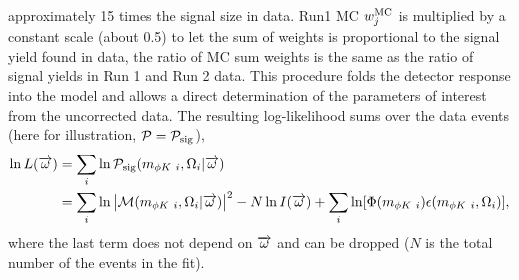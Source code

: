 approximately 15 times the signal size in data. Run1 MC $w_j^{\rm MC}$ is multiplied by a constant 
scale (about 0.5) to let the sum of weights is proportional to the signal yield found in data, \ie the ratio of MC sum weights is
the same as the ratio of signal yields in Run 1 and Run 2 data.
This procedure folds the detector response into the model 
and allows a direct determination of the parameters of interest from the uncorrected data. 
The resulting log-likelihood 
sums over the data events (here for illustration, ${\cal P}={\cal P}_{\rm sig}$),
{%
\def\1{\ifthenelse{\boolean{prl}}{}{\!\!}}
\begin{equation}
\begin{split}
\ln L(\Pars) & = \sum_i \ln \PDF_{\rm sig}(m_{\phi K~i},\Omega_i|\Pars)  \\%
 & = \sum_i \ln \big|\Mat(m_{\phi K~i},\Omega_i|\Pars)\big|^2  - N\ln I(\Pars) + \sum_i \ln[ \Phi(m_{\phi K~i})\epsilon(m_{\phi K~i},\Omega_i) ],
\end{split}
\end{equation}
}%
where the last term does not depend on $\overrightarrow{\omega}$ and can be dropped ($N$ is the total number of the events in the fit).   

